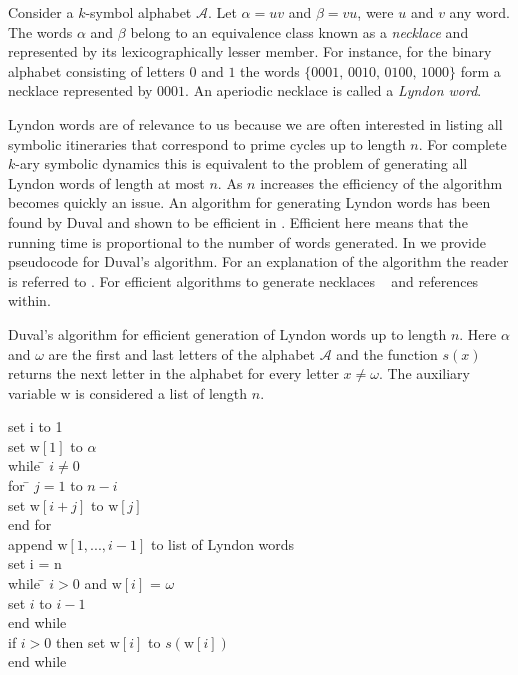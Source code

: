\renewcommand{\inputfile}{\version\ - edited 2008-06-26 lyndon}

Consider a $k$-symbol alphabet $\mathcal{A}$. Let
$\alpha=uv$ and $\beta=vu$, were $u$ and $v$ any word. The words $\alpha$
and $\beta$ belong to an equivalence class known as a \emph{necklace} and
represented by its
lexicographically lesser member.
For instance, for the binary alphabet consisting of letters $0$ and $1$
the words $\{0001,\, 0010,\, 0100,\, 1000\}$ form a necklace
represented by $0001$. An aperiodic necklace is called a \emph{Lyndon word}.

Lyndon words are of relevance to us because we are often
interested in listing all symbolic itineraries that correspond
to prime cycles up to length $n$. For complete $k$-ary symbolic
dynamics this is equivalent to the problem of generating all
Lyndon words of length at most $n$. As $n$ increases the
efficiency of the algorithm becomes quickly an issue. An
algorithm for generating Lyndon words has been found by
Duval and shown to be efficient in
. Efficient here means that the
running time is proportional to the number of words generated.
In  we provide pseudocode for Duval's
algorithm. For an explanation of the algorithm the reader is
referred to . For efficient algorithms to
generate necklaces \cf~ and references
within.

\begin{table} \label{tab:duval}
\caption[Duval's algorithm for generation of Lyndon words]
        {
Duval's algorithm for efficient generation of Lyndon words up
to length $n$. Here $\alpha$ and $\omega$ are the first and
last letters of the alphabet $\mathcal{A}$ and the function
$s(x)$ returns the next letter in the alphabet for every letter
$x \neq \omega$. The auxiliary variable $\mathrm{w}$ is
considered a list of length $n$.
}
\begin{tabbing}
   set i to 1 \\
   set $\mathrm{w}[1]$ to $\alpha$ \\
   while \= $i \neq 0$ \\
    	 \>  for \= $j=1$ to $n-i$ \\
         \>	\>  set $\mathrm{w}[i+j]$ to $\mathrm{w}[j]$ \\
	 \>  end for  \\
         \>  append $\mathrm{w}[1,...,i-1]$ to list of Lyndon words \\
         \>  set i = n \\
         \>  while \=  $i > 0$ and $\mathrm{w}[i]$ = $\omega$ \\
         \>       \> set $i$ to $i - 1$ \\
     	 \>  end while	\\	
         \>  if $i > 0$ then set $\mathrm{w}[i]$ to $s(\mathrm{w}[i])$ \\
   end while
\end{tabbing}
\end{table}


